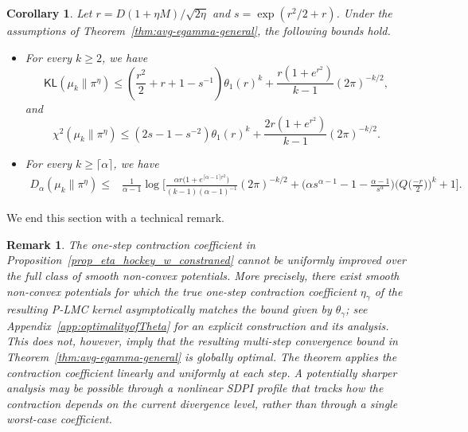 \documentclass[10pt, journal]{IEEEtran}
\newtheorem{remark}{Remark}
\newtheorem{corollary}{Corollary}
\begin{document}
\begin{corollary}
\label{corollary_KL_chi_PLMC}
Let $r=D(1+\eta M)/\sqrt{2\eta}$ and $s=\exp(r^2/2+r)$. Under the assumptions of Theorem~\ref{thm:avg-egamma-general}, the following bounds hold.
\begin{itemize}[leftmargin=*]
\item For every $k\ge 2$, we have 
$$\mathsf{KL}(\mu_k\|\pi^\eta)\le \left(\frac{r^2}{2}+r+1-s^{-1}\right)\theta_1(r)^k+\frac{r(1+e^{r^2})}{k-1}(2\pi)^{-k/2},$$
and $$\chi^2(\mu_k\|\pi^\eta)\le \left(2s-1-s^{-2}\right)\theta_1(r)^k+\frac{2r(1+e^{r^2})}{k-1}(2\pi)^{-k/2}.$$
\item For every $k \ge \lceil \alpha\rceil$, we have
        \begin{align}
            D_{\alpha}(\mu_{k} \| \pi^\eta) \leq&\frac{1}{\alpha - 1} \log \Bigg[ \frac{\alpha r \big(1 + e^{\lceil \alpha-1 \rceil r^2}\big)}{(k-1)(\alpha-1)^{-1}} (2\pi)^{-k/2} + \Big(\alpha s^{\alpha-1}-1 -\frac{\alpha - 1}{s^{\alpha}}\Big) \Big( Q\big(\frac{-r}{2}\big) \Big)^k+ 1\Bigg]\nonumber.
        \end{align}
\end{itemize}
\end{corollary}


We end this section with a technical remark. 


\begin{remark} 
The one-step contraction coefficient in Proposition~\ref{prop_eta_hockey_w_constraned} cannot be uniformly improved over the full class of smooth non-convex potentials. More precisely, there exist smooth non-convex potentials for which the true one-step contraction coefficient $\eta_\gamma$ of the resulting P-LMC kernel asymptotically matches the bound given by $\theta_\gamma$; see Appendix~\ref{app:optimalityofTheta} for an explicit construction and its analysis. This does not, however, imply that the resulting multi-step convergence bound in Theorem~\ref{thm:avg-egamma-general} is globally optimal. The theorem applies the contraction coefficient \textit{linearly} and uniformly at each step. A potentially sharper analysis may be possible through a nonlinear SDPI profile that tracks how the contraction depends on the current divergence level, rather than through a single worst-case coefficient.
\end{remark}
\end{document}
